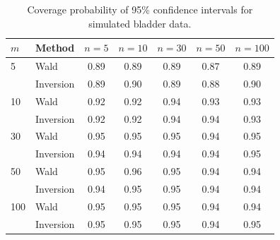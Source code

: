 \documentclass{article}\usepackage[]{graphicx}\usepackage[]{color}
\makeatletter
\newenvironment{kframe}{%
 \def\at@end@of@kframe{}%
 \ifinner\ifhmode%
  \def\at@end@of@kframe{\end{minipage}}%
  \begin{minipage}{\columnwidth}%
 \fi\fi%
 \def\FrameCommand##1{\hskip\@totalleftmargin \hskip-\fboxsep
 \colorbox{shadecolor}{##1}\hskip-\fboxsep
     \hskip-\linewidth \hskip-\@totalleftmargin \hskip\columnwidth}%
 \MakeFramed {\advance\hsize-\width
   \@totalleftmargin\z@ \linewidth\hsize
   \@setminipage}}%
 {\par\unskip\endMakeFramed%
 \at@end@of@kframe}
\newenvironment{knitrout}{}{} %
\makeatother
\begin{document}
\begin{table}[!htb]
\centering
\begin{tabular}{llccccc}
  \toprule
  $m$  & Method    & \hspace{8pt}$n = 5$\hspace{8pt} & \hspace{8pt}$n = 10$\hspace{8pt} & \hspace{8pt}$n = 30$\hspace{8pt} & \hspace{8pt}$n = 50$\hspace{8pt} & \hspace{8pt}$n = 100$ \hspace{8pt} \\
  \hline
  5    & Wald      & 0.89    & 0.89     & 0.89     & 0.87     & 0.89      \\
       & Inversion & 0.89    & 0.90     & 0.89     & 0.88     & 0.90      \\ \hline
  10   & Wald      & 0.92    & 0.92     & 0.94     & 0.93     & 0.93      \\
       & Inversion & 0.92    & 0.92     & 0.94     & 0.94     & 0.93      \\ \hline
  30   & Wald      & 0.95    & 0.95     & 0.95     & 0.94     & 0.95      \\
       & Inversion & 0.94    & 0.94     & 0.94     & 0.94     & 0.95      \\ \hline
  50   & Wald      & 0.95    & 0.96     & 0.95     & 0.94     & 0.94      \\
       & Inversion & 0.94    & 0.95     & 0.95     & 0.94     & 0.94      \\ \hline
  100  & Wald      & 0.95    & 0.95     & 0.95     & 0.94     & 0.94      \\
       & Inversion & 0.95    & 0.95     & 0.95     & 0.94     & 0.95      \\
  \bottomrule
\end{tabular}
\caption{Coverage probability of 95\% confidence intervals for simulated bladder data. \label{tab:simulation}}
\end{table}%

\begin{knitrout}
\color{fgcolor}\begin{kframe}


{\ttfamily\noindent\bfseries{}}\end{kframe}
\end{knitrout}
\end{document}
